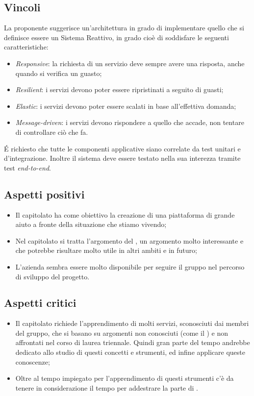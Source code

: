 \subsection{Vincoli}
La proponente suggerisce un'architettura in grado di implementare quello che si definisce essere un Sistema Reattivo, in grado cioè di soddisfare le seguenti caratteristiche: 
\begin{itemize}
\item \textit{Responsive}: la richiesta di un servizio deve sempre avere una risposta, anche quando si verifica un guasto; 
\item \textit{Resilient}: i servizi devono poter essere ripristinati a seguito di guasti; 
\item \textit{Elastic}: i servizi devono poter essere scalati in base all'effettiva domanda; 
\item \textit{Message-driven}: i servizi devono rispondere a quello che accade, non tentare di controllare ciò che fa.  
\end{itemize}
\'E richiesto che tutte le componenti applicative siano correlate da test unitari e d’integrazione. Inoltre il sistema deve essere testato nella sua interezza tramite test \textit{end-to-end}. 

\subsection{Aspetti positivi}
\begin{itemize}
\item Il capitolato ha come obiettivo la creazione di una piattaforma di grande aiuto a fronte della situazione che stiamo vivendo;
\item Nel capitolato si tratta l'argomento del , un argomento molto interessante e che potrebbe risultare molto utile in altri ambiti e in futuro;
\item L'azienda sembra essere molto disponibile per seguire il gruppo nel percorso di sviluppo del progetto.
\end{itemize}

\subsection{Aspetti critici}
\begin{itemize}
\item Il capitolato richiede l'apprendimento di molti servizi, sconosciuti dai membri del gruppo, che si basano su argomenti non conosciuti (come il ) e non affrontati nel corso di laurea triennale. Quindi gran parte del tempo andrebbe dedicato allo studio di questi concetti e strumenti, ed infine applicare queste conoscenze;
\item Oltre al tempo impiegato per l'apprendimento di questi strumenti c'è da tenere in considerazione il tempo per addestrare la parte di .
\end{itemize}

